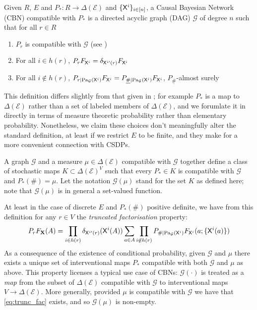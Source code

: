 \begin{definition}\label{def:CBN}

Given $R$, $E$ and $P_*:R\to \Delta(\mathcal{E})$ and $\{\mathsf{X}^i\}_{i\in [n]}$, a Causal Bayesian Network (CBN) compatible with $P_*$ is a directed acyclic graph (DAG) $\mathcal{G}$ of degree $n$ such that for all $r\in R$

\begin{enumerate}
    \item $P_r$ is compatible with $\mathcal{G}$ (see \citet{pearl_causality:_2009})
    \item For all $i\in h(r)$, $P_r F_{\mathsf{X}^i}=\delta_{\mathsf{X}^{i\prime}(r)} F_{\mathsf{X}^i}$
    \item For all $i\not \in h(r)$, $P_{r|\text{Pa}_{\mathcal{G}}(\mathsf{X}^i)} F_{\mathsf{X}^i}=P_{\underline{\#}|\text{Pa}_{\mathcal{G}}(\mathsf{X}^i)}F_{\mathsf{X}^i} $, $P_{\underline{\#}}$-almost surely
\end{enumerate}
\end{definition}

This definition differs slightly from that given in \citet{pearl_causality:_2009}; for example $P_*$ is a map to $\Delta(\mathcal{E})$ rather than a set of labeled members of $\Delta(\mathcal{E})$, and we forumlate it in directly in terms of measure theoretic probability rather than elementary probability. Nonetheless, we claim these choices don't meaningfully alter the standard definition, at least if we restrict $E$ to be finite, and they make for a more convenient connection with CSDPs.

A graph $\mathcal{G}$ and a measure $\mu\in \Delta(\mathcal{E})$ compatible with $\mathcal{G}$ together define a class of stochastic maps $K\subset \Delta(\mathcal{E})^V$ such that every $P_*\in K$ is compatible with $\mathcal{G}$ and $P_*(\#)=\mu$. Let the notation $\mathcal{G}(\mu)$ stand for the set $K$ as defined here; note that $\mathcal{G}(\mu)$ is in general a set-valued function.

At least in the case of discrete $E$ and $P_*(\#)$ positive definite, we have from this definition for any $r\in V$ the \emph{truncated factorisation} property:
\begin{align}
	P_r F_{\mathbf{X}}(A) = \prod_{i\in h(r)} \delta_{\mathsf{X}^{i\prime} (r)} (\mathsf{X}^i(A)) \sum_{a\in A} \prod_{i\not \in h(r)} P_{\#|\text{Pa}_{\mathcal{G}}(\mathsf{X}^i)} F_{\mathsf{X}^i} (a;\{\mathsf{X}^i(a)\})\label{eq:trunc_fac}
\end{align}
As a consequence of the existence of conditional probability, given $\mathcal{G}$ and $\mu$ there exists a unique set of interventional maps $P_*$ compatible with both $\mathcal{G}$ and $\mu$ as above. This property licenses a typical use case of CBNs: $\mathcal{G}(\cdot)$ is treated as a \emph{map} from the subset of $\Delta(\mathcal{E})$ compatible with $\mathcal{G}$ to interventional maps $V\to \Delta(\mathcal{E})$. More generally, provided $\mu$ is compatible with $\mathcal{G}$ we have that \ref{eq:trunc_fac} exists, and so $\mathcal{G}(\mu)$ is non-empty.

